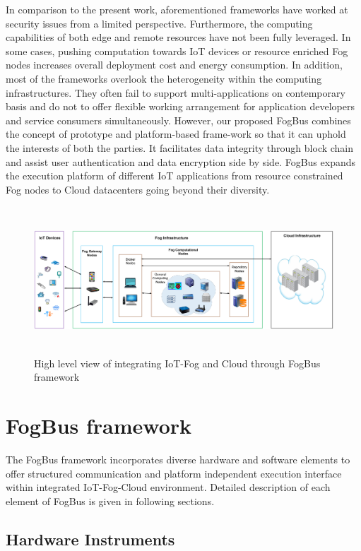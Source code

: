 \documentclass[final,5p,times,twocolumn]{elsarticle}
\begin{document}
%      
\par In comparison to the present work, aforementioned frameworks have worked at security issues from a limited perspective. Furthermore, the computing capabilities of both edge and remote resources have not been fully leveraged. In some cases, pushing computation towards IoT devices or resource enriched Fog nodes increases overall deployment cost and energy consumption. In addition, most of the frameworks overlook the heterogeneity within the computing infrastructures. They often fail to support multi-applications on contemporary basis and do not to offer flexible working arrangement for application developers and service consumers simultaneously. However, our proposed FogBus combines the concept of prototype and platform-based frame-work so that it can uphold the interests of both the parties. It facilitates data integrity through block chain and assist user authentication and data encryption side by side. FogBus expands the execution platform of different IoT applications from resource constrained Fog nodes to Cloud datacenters going beyond their diversity.  
%    
\begin{figure}[t]
\centering 
\includegraphics[width=175mm, height= 55mm]{FogBus.png}
\caption{High level view of integrating IoT-Fog and Cloud through FogBus framework}
\label{Fig:fogbus}
\end{figure} 
%
\section{FogBus framework} \label{mainPart}
The FogBus framework incorporates diverse hardware and software elements to offer structured communication and platform independent execution interface within integrated IoT-Fog-Cloud environment. Detailed description of each element of FogBus is given in following sections.    
%   

\subsection{Hardware Instruments}
\end{document}
